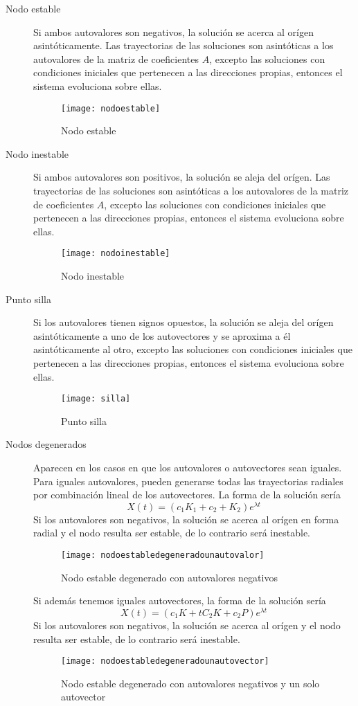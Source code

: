 \begin{description}

\item[Nodo estable]
Si ambos autovalores son negativos, la solución se acerca al orígen asintóticamente.
Las trayectorias de las soluciones son asintóticas a los autovalores de la matriz de coeficientes $A$, excepto las soluciones con condiciones iniciales que pertenecen a las direcciones propias, entonces el sistema evoluciona sobre ellas.
%
\begin{figure}
\centering\texttt{[image: nodoestable]}
\caption{Nodo estable}
\end{figure}

\item[Nodo inestable]
Si ambos autovalores son positivos, la solución se aleja del orígen.
Las trayectorias de las soluciones son asintóticas a los autovalores de la matriz de coeficientes $A$, excepto las soluciones con condiciones iniciales que pertenecen a las direcciones propias, entonces el sistema evoluciona sobre ellas.
%
\begin{figure}
\centering\texttt{[image: nodoinestable]}
\caption{Nodo inestable}
\end{figure}

\item[Punto silla]
Si los autovalores tienen signos opuestos, la solución se aleja del orígen asintóticamente a uno de los autovectores y se aproxima a él asintóticamente al otro, excepto las soluciones con condiciones iniciales que pertenecen a las direcciones propias, entonces el sistema evoluciona sobre ellas.
%
\begin{figure}
\centering\texttt{[image: silla]}
\caption{Punto silla}
\end{figure}

\item[Nodos degenerados]
Aparecen en los casos en que los autovalores o autovectores sean iguales.
Para iguales autovalores, pueden generarse todas las trayectorias radiales por combinación lineal de los autovectores. La forma de la solución sería
\begin{equation}
X(t)=(c_1K_1+c_2+K_2)e^{\lambda t} \nonumber
\end{equation}
Si los autovalores son negativos, la solución se acerca al orígen en forma radial y el nodo resulta ser estable, de lo contrario será inestable.
\begin{figure}
\centering\texttt{[image: nodoestabledegeneradounautovalor]}
\caption{Nodo estable degenerado con autovalores negativos}
\end{figure}
Si además tenemos iguales autovectores, la forma de la solución sería
\begin{equation}
X(t)=(c_1K+tC_2K+c_2P)e^{\lambda t} \nonumber
\end{equation}
Si los autovalores son negativos, la solución se acerca al orígen y el nodo resulta ser estable, de lo contrario será inestable.
\begin{figure}
\centering\texttt{[image: nodoestabledegeneradounautovector]}
\caption{Nodo estable degenerado con autovalores negativos y un solo autovector}
\end{figure}


\end{description}
